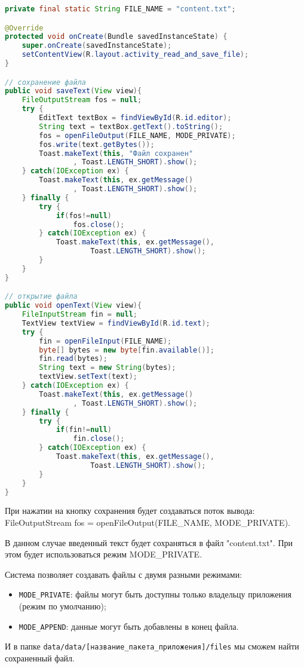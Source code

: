 \begin{lstlisting}[language=Java
	, label=lst:
	]
private final static String FILE_NAME = "content.txt";

@Override
protected void onCreate(Bundle savedInstanceState) {
	super.onCreate(savedInstanceState);
	setContentView(R.layout.activity_read_and_save_file);
}

// сохранение файла
public void saveText(View view){
	FileOutputStream fos = null;
	try {
		EditText textBox = findViewById(R.id.editor);
		String text = textBox.getText().toString();
		fos = openFileOutput(FILE_NAME, MODE_PRIVATE);
		fos.write(text.getBytes());
		Toast.makeText(this, "Файл сохранен"
				, Toast.LENGTH_SHORT).show();
	} catch(IOException ex) {
		Toast.makeText(this, ex.getMessage()
				, Toast.LENGTH_SHORT).show();
	} finally {
		try {
			if(fos!=null)
				fos.close();
		} catch(IOException ex) {
			Toast.makeText(this, ex.getMessage(),
					Toast.LENGTH_SHORT).show();
		}
	}
}

// открытие файла
public void openText(View view){
	FileInputStream fin = null;
	TextView textView = findViewById(R.id.text);
	try {
		fin = openFileInput(FILE_NAME);
		byte[] bytes = new byte[fin.available()];
		fin.read(bytes);
		String text = new String(bytes);
		textView.setText(text);
	} catch(IOException ex) {
		Toast.makeText(this, ex.getMessage()
				, Toast.LENGTH_SHORT).show();
	} finally {
		try {
			if(fin!=null)
				fin.close();
		} catch(IOException ex) {
			Toast.makeText(this, ex.getMessage(),
					Toast.LENGTH_SHORT).show();
		}
	}
}
\end{lstlisting}

При нажатии на кнопку сохранения будет создаваться поток вывода:
FileOutputStream fos = openFileOutput(FILE\_NAME, MODE\_PRIVATE).\par
В данном случае введенный текст будет сохраняться в файл "content.txt". При
этом будет использоваться режим MODE\_PRIVATE.\par
Система позволяет создавать файлы с двумя разными режимами:

\begin{itemize}
	\item \texttt{MODE\_PRIVATE}: файлы могут быть доступны только владельцу
		приложения (режим по умолчанию);
	\item \texttt{MODE\_APPEND}: данные могут быть добавлены в конец файла.
\end{itemize}

И в папке \verb|data/data/[название_пакета_приложения]/files| мы сможем найти
сохраненный файл.

